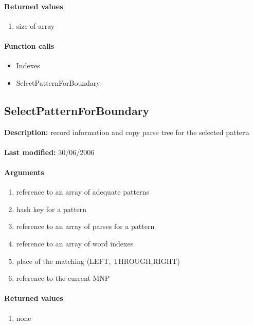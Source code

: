 \paragraph{Returned values}
\begin{enumerate}
\item size of array

\end{enumerate}

\paragraph{Function calls}
\begin{itemize}
\item Indexes
\item SelectPatternForBoundary
\end{itemize}

\subsection{SelectPatternForBoundary}
\textbf{Description:} record information and copy parse tree for the selected pattern\\
\\\textbf{Last modified:} 30/06/2006

\paragraph{Arguments}
\begin{enumerate}
\item reference to an array of adequate patterns
\item hash key for a pattern
\item reference to an array of parses for a pattern
\item reference to an array of word indexes
\item place of the matching (LEFT, THROUGH,RIGHT)
\item reference to the current MNP
\end{enumerate}

\paragraph{Returned values}
\begin{enumerate}
\item none
\end{enumerate}

